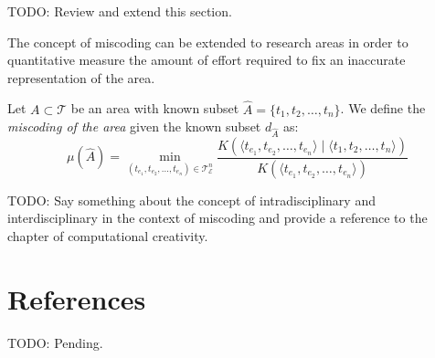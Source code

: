 {\color{red} TODO: Review and extend this section.}

The concept of miscoding can be extended to research areas in order to quantitative measure the amount of effort required to fix an inaccurate representation of the area.

\begin{definition}
Let $A \subset \mathcal{T}$ be an area with known subset $\hat{A} = \{t_1, t_2, \ldots, t_n\}$. We define the \emph{miscoding of the area} given the known subset $d_{\hat{A}}$ as:
\[
\mu(\hat{A}) = \min_{(t_{e_1}, t_{e_2}, \ldots, t_{e_n}) \in \mathcal{T}_\mathcal{E}^n}  \frac{K \left( \langle t_{e_1}, t_{e_2}, \ldots, t_{e_n} \rangle \mid \langle t_1, t_2, \ldots, t_n \rangle \right) }{K \left( \langle t_{e_1}, t_{e_2}, \ldots, t_{e_n} \rangle \right)}
\]
\end{definition}

{\color{red} TODO: Say something about the concept of intradisciplinary and interdisciplinary in the context of miscoding and provide a reference to the chapter of computational creativity.}

%
%

\section*{References}

{\color{red} TODO: Pending.}
